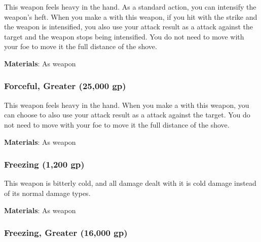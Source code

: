 This weapon feels heavy in the hand.
As a standard action, you can intensify the weapon's heft.
When you make a  with this weapon, if you hit with the strike and the weapon is intensified,
you also use your attack result as a  attack against the target and the weapon stops being intensified.
You do not need to move with your foe to move it the full distance of the shove.



\vspace{0.25em}
\textbf{Materials}: As weapon


\lowercase{\hypertarget{item:Forceful, Greater}{}}\label{item:Forceful, Greater}
\hypertarget{item:Forceful, Greater}{\subsubsection{Forceful, Greater\hfill{} (25,000 gp)}}

This weapon feels heavy in the hand.
When you make a  with this weapon, you can choose to also use your attack result as a  attack against the target.
You do not need to move with your foe to move it the full distance of the shove.



\vspace{0.25em}
\textbf{Materials}: As weapon


\lowercase{\hypertarget{item:Freezing}{}}\label{item:Freezing}
\hypertarget{item:Freezing}{\subsubsection{Freezing\hfill{} (1,200 gp)}}

This weapon is bitterly cold, and all damage dealt with it is cold damage instead of its normal damage types.



\vspace{0.25em}
\textbf{Materials}: As weapon


\lowercase{\hypertarget{item:Freezing, Greater}{}}\label{item:Freezing, Greater}
\hypertarget{item:Freezing, Greater}{\subsubsection{Freezing, Greater\hfill{} (16,000 gp)}}

